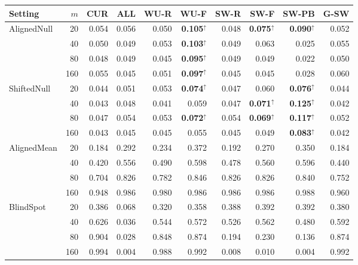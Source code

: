 \begin{tabular}{@{}lrrrrrrrrr@{}}
\toprule
Setting & $m$ & CUR & ALL & WU-R & WU-F & SW-R & SW-F & SW-PB & G-SW\\
\midrule
AlignedNull & 20 & 0.054 & 0.056 & 0.050 & \textbf{0.105}$^{\uparrow}$ & 0.048 & \textbf{0.075}$^{\uparrow}$ & \textbf{0.090}$^{\uparrow}$ & 0.052\\
 & 40 & 0.050 & 0.049 & 0.053 & \textbf{0.103}$^{\uparrow}$ & 0.049 & 0.063 & 0.025 & 0.055\\
 & 80 & 0.048 & 0.049 & 0.045 & \textbf{0.095}$^{\uparrow}$ & 0.049 & 0.049 & 0.022 & 0.050\\
 & 160 & 0.055 & 0.045 & 0.051 & \textbf{0.097}$^{\uparrow}$ & 0.045 & 0.045 & 0.028 & 0.060\\
\addlinespace[2pt]
ShiftedNull & 20 & 0.044 & 0.051 & 0.053 & \textbf{0.074}$^{\uparrow}$ & 0.047 & 0.060 & \textbf{0.076}$^{\uparrow}$ & 0.044\\
 & 40 & 0.043 & 0.048 & 0.041 & 0.059 & 0.047 & \textbf{0.071}$^{\uparrow}$ & \textbf{0.125}$^{\uparrow}$ & 0.042\\
 & 80 & 0.047 & 0.054 & 0.053 & \textbf{0.072}$^{\uparrow}$ & 0.054 & \textbf{0.069}$^{\uparrow}$ & \textbf{0.117}$^{\uparrow}$ & 0.052\\
 & 160 & 0.043 & 0.045 & 0.045 & 0.055 & 0.045 & 0.049 & \textbf{0.083}$^{\uparrow}$ & 0.042\\
\addlinespace[2pt]
AlignedMean & 20 & 0.184 & 0.292 & 0.234 & 0.372 & 0.192 & 0.270 & 0.350 & 0.184\\
 & 40 & 0.420 & 0.556 & 0.490 & 0.598 & 0.478 & 0.560 & 0.596 & 0.440\\
 & 80 & 0.704 & 0.826 & 0.782 & 0.846 & 0.826 & 0.826 & 0.840 & 0.752\\
 & 160 & 0.948 & 0.986 & 0.980 & 0.986 & 0.986 & 0.986 & 0.988 & 0.960\\
\addlinespace[2pt]
BlindSpot & 20 & 0.386 & 0.068 & 0.320 & 0.358 & 0.388 & 0.392 & 0.392 & 0.380\\
 & 40 & 0.626 & 0.036 & 0.544 & 0.572 & 0.526 & 0.562 & 0.480 & 0.592\\
 & 80 & 0.904 & 0.028 & 0.848 & 0.874 & 0.194 & 0.230 & 0.136 & 0.874\\
 & 160 & 0.994 & 0.004 & 0.988 & 0.992 & 0.008 & 0.010 & 0.004 & 0.992\\
\bottomrule
\end{tabular}
